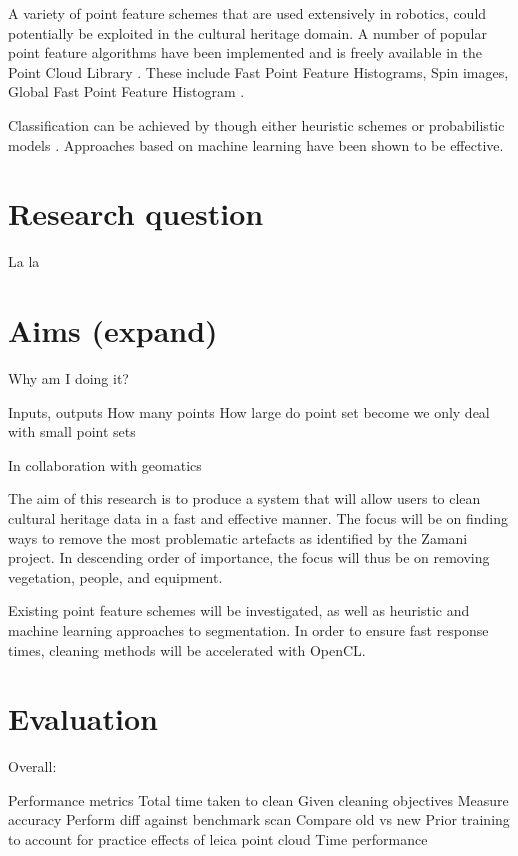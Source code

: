 \documentclass[10pt,twocolumn]{article}
\begin{document}
A variety of point feature schemes that are used extensively in robotics, could potentially be exploited in the cultural heritage domain. A number of popular point feature algorithms have been implemented and is freely available in the Point Cloud Library \cite{Rusu2011}. These include Fast Point Feature Histograms, Spin images, Global Fast Point Feature Histogram \cite{Rusu2011}.

Classification can be achieved by though either heuristic schemes \cite{Spina2010} or probabilistic models \cite{Shapovalov2010,Rusu2009}. Approaches based on machine learning have been shown to be effective.


\section{Research question}
La la

\section{Aims (expand)}
Why am I doing it?

Inputs, outputs
How many points
How large do point set become
we only deal with small point sets



In collaboration with geomatics

The aim of this research is to produce a system that will allow users to clean cultural heritage data in a fast and effective manner. The focus will be on finding ways to remove the most problematic artefacts as identified by the Zamani project. In descending order of importance, the focus will thus be on removing vegetation, people, and equipment. 

Existing point feature schemes will be investigated, as well as heuristic and machine learning approaches to segmentation. In order to ensure fast response times, cleaning methods will be accelerated with OpenCL.

\section{Evaluation}

Overall:

Performance metrics
	Total time taken to clean
		Given cleaning objectives
		Measure accuracy
			Perform diff against benchmark scan
		Compare old vs new
		Prior training to account for practice effects of leica point cloud
	Time performance
		
\end{document}
